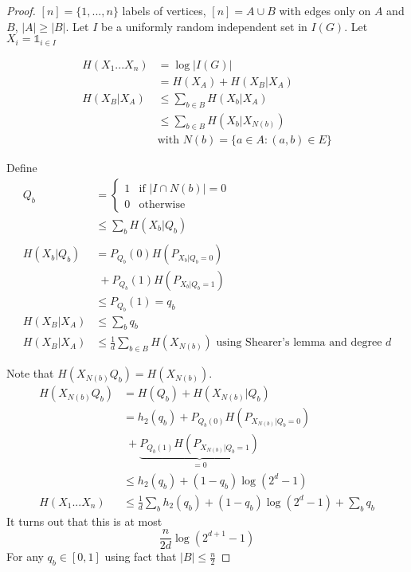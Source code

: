 \documentclass{article}
\begin{document}
\begin{proof}
$[n]=\{1,...,n\}$ labels of vertices, $[n]=A\cup B$ with edges only on $A$ and $B$, $|A|\geq |B|$. Let $I$ be a uniformly random independent set in $I(G)$. Let $X_i=\mathbb{1}_{i\in I}$

\begin{align*}
H(X_1...X_n) & = \log | I(G) |\\
& = H(X_A)+H(X_B|X_A)\\
H(X_B|X_A)&\leq \sum_{b\in B}H(X_b|X_A)\\
&\leq \sum_{b\in B} H(X_b|X_{N(b)})\\
& \text{with }N(b)=\{ a\in A : (a,b)\in E\}
\end{align*}

Define 
\begin{align*}
Q_b & = \begin{cases}
1 & \text{if } |I\cap N(b)|=0\\
0 & \text{otherwise}
\end{cases}\\
& \leq \sum_{b} H(X_b | Q_b)\\
\\
H(X_b|Q_b) & = P_{Q_b}(0)H(P_{X_b|Q_b=0})\\
& \; + P_{Q_b}(1)H(P_{X_b|Q_b=1})\\
&\leq P_{Q_b}(1) = q_b\\
H(X_B|X_A) & \leq \sum_b q_b\\
H(X_B|X_A) & \leq \frac{1}{d}\sum_{b\in B} H(X_{N(b)}) \text{ using Shearer's lemma and degree }d
\end{align*}

Note that $H(X_{N(b)}Q_b)=H(X_{N(b)})$.
\begin{align*}
H(X_{N(b)}Q_b) & =H(Q_b)+H(X_{N(b)}|Q_b)\\
& = h_2(q_b)+P_{Q_b(0)}H(P_{X_{N(b)}|Q_b=0})\\
& \; + \underbrace{P_{Q_b(1)}H(P_{X_{N(b)}|Q_b=1})}_{=0}\\
& \leq h_2 (q_b)+(1-q_b)\log (2^d - 1)\\
H(X_1...X_n) & \leq \frac{1}{d} \sum_{b} h_2(q_{b})+(1-q_b)\log (2^d - 1) + \sum_{b} q_b
\end{align*}
It turns out that this is at most
\[\frac{n}{2d}\log (2^{d+1}-1)\]
For any $q_b\in [0,1]$ using fact that $|B|\leq \frac{n}{2}$
\end{proof}
\end{document}
